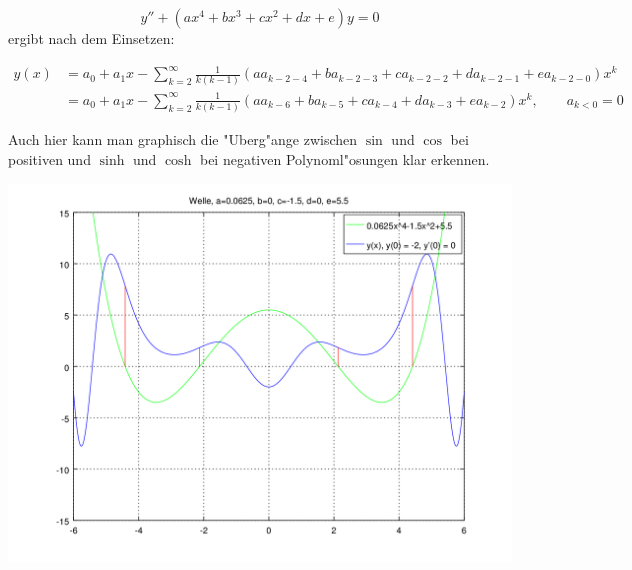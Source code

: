 \begin{equation*}
	y''+(ax^4+bx^3+cx^2+dx+e)y = 0
\end{equation*}
ergibt nach dem Einsetzen:

\begin{align*}
	y(x) &= a_0+a_1x-\sum_{k=2}^{\infty} \frac{1}{k(k-1)} (aa_{k-2-4} + 
	ba_{k-2-3} + ca_{k-2-2} + da_{k-2-1} +ea_{k-2-0})x^k
	\\
	&= a_0+a_1x-\sum_{k=2}^{\infty} \frac{1}{k(k-1)} (aa_{k-6} + ba_{k-5} + 
	ca_{k-4} + da_{k-3} +ea_{k-2})x^k, \qquad a_{k<0} = 0
\end{align*}

Auch hier kann man graphisch die "Uberg"ange zwischen $\sin$ und $\cos$ bei 
positiven und $\sinh$ und $\cosh$ bei negativen Polynoml"osungen klar erkennen.

\begin{center}
	\includegraphics[scale=0.65]{./wellen/images/allgemein/n4.png}
\end{center}